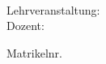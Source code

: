 \begin{titlepage}
	\noindent
	\universitaet \\
	\seminar \\
	\semester \\
	Lehrveranstaltung: \lehrveranstaltung \\
	Dozent: \dozent

	\centering
	\vspace*{2cm}
	\Huge
	\textbf{\arbeitstitel}

	\vspace{1cm}
	\LARGE
	\untertitel

	\vfill
	\large
	\autorname

	\vspace{0.1cm}
	\large
	Matrikelnr. \matrikelnr

	\vspace{0.1cm}
	\studiengang

	\vspace{0.1cm}
	\email

	\vspace{0.1cm}
	\abgabedatum

	\vspace*{1cm}
\end{titlepage}
